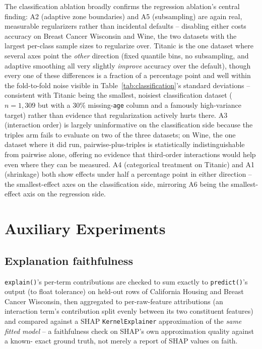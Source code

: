 \documentclass[11pt]{article}
\begin{document}
The classification ablation broadly confirms the regression ablation's
central finding: A2 (adaptive zone boundaries) and A5 (subsampling) are
again real, measurable regularizers rather than incidental defaults --
disabling either costs accuracy on Breast Cancer Wisconsin and Wine, the
two datasets with the largest per-class sample sizes to regularize over.
Titanic is the one dataset where several axes point the \emph{other}
direction (fixed quantile bins, no subsampling, and adaptive smoothing all
very slightly \emph{improve} accuracy over the default), though every one
of these differences is a fraction of a percentage point and well within
the fold-to-fold noise visible in Table~\ref{tab:classification}'s standard
deviations -- consistent with Titanic being the smallest, noisiest
classification dataset ($n=1{,}309$ but with a 30\% missing-\texttt{age}
column and a famously high-variance target) rather than evidence that
regularization actively hurts there. A3 (interaction order) is largely
uninformative on the classification side because the triples arm fails to
evaluate on two of the three datasets; on Wine, the one dataset where it
did run, pairwise-plus-triples is statistically indistinguishable from
pairwise alone, offering no evidence that third-order interactions would
help even where they can be measured. A4 (categorical treatment on
Titanic) and A1 (shrinkage) both show effects under half a percentage
point in either direction -- the smallest-effect axes on the classification
side, mirroring A6 being the smallest-effect axis on the regression side.

\section{Auxiliary Experiments}
\label{sec:auxiliary}

\subsection{Explanation faithfulness}
\texttt{explain()}'s per-term contributions are checked to sum exactly to
\texttt{predict()}'s output (to float tolerance) on held-out rows of
California Housing and Breast Cancer Wisconsin, then aggregated to
per-raw-feature attributions (an interaction term's contribution split
evenly between its two constituent features) and compared against a
SHAP \texttt{KernelExplainer} approximation of the \emph{same fitted model}
-- a faithfulness check on SHAP's own approximation quality against a known-
exact ground truth, not merely a report of SHAP values on faith.
\end{document}
